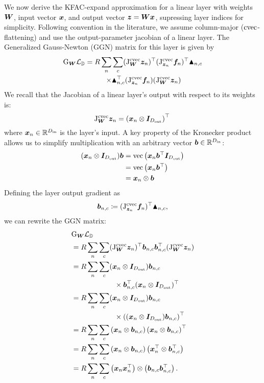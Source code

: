 We now derive the KFAC-expand approximation for a linear layer with weights ${\bm{W}}$, input vector ${\bm{x}}$, and output vector ${\bm{z}} = {\bm{W}}{\bm{x}}$, supressing layer indices for simplicity. Following convention in the literature, we assume column-major ($\operatorname{cvec}$-flattening) and use the output-parameter jacobian of a linear layer. The Generalized Gauss-Newton (GGN) matrix for this layer is given by
\begin{align*}
  \mathrm{G}_{{\bm{W}}} {\mathcal{L}}_{{\mathbb{D}}}
  =
    R
    \sum_n &\sum_c
    (\mathrm{J}^{\operatorname{cvec}}_{{\bm{W}}}{\bm{z}}_n)^{\top}
    (\mathrm{J}^{\operatorname{cvec}}_{{\bm{z}}_n}{\bm{f}}_n)^{\top}
    \blacktriangle_{n,c} \\
    \times
    &\blacktriangle_{n,c}^{\top}
    (\mathrm{J}^{\operatorname{cvec}}_{{\bm{z}}_n}{\bm{f}}_n)
    (\mathrm{J}^{\operatorname{cvec}}_{{\bm{W}}}{\bm{z}}_n)
\end{align*}
We recall that the Jacobian of a linear layer's output with respect to its weights is:
$$ \mathrm{J}^{\operatorname{cvec}}_{{\bm{W}}}{\bm{z}}_n = \left({\bm{x}}_n \otimes {\bm{I}}_{D_{\text{out}}}\right)^{\top}\, $$
where ${\bm{x}}_n \in \mathbb{R}^{D_\text{in}}$ is the layer's input. 
A key property of the Kronecker product allows us to simplify multiplication with an arbitrary vector ${\bm{b}} \in {\mathbb{R}}^{D_{\text{in}}}$:
\begin{align*} 
  ({\bm{x}}_n \otimes {\bm{I}}_{D_{\text{out}}}) {\bm{b}} &= \text{vec}\left({\bm{x}}_n {\bm{b}}^{\top}{\bm{I}}_{D_{\text{out}}}\right) \\
  &= \text{vec}\left( {\bm{x}}_n {\bm{b}}^{\top} \right) \\
  &= {\bm{x}}_n \otimes {\bm{b}}
\end{align*}
Defining the layer output gradient as $${\bm{b}}_{n,c} \coloneq (\mathrm{J}^{\operatorname{cvec}}_{{\bm{z}}_n}{\bm{f}}_n)^{\top} \blacktriangle_{n,c},$$ we can rewrite the GGN matrix:
\begin{align*}
  &\mathrm{G}_{{\bm{W}}} {\mathcal{L}}_{{\mathbb{D}}} \\
  &= R \sum_n \sum_c
  (\mathrm{J}^{\operatorname{cvec}}_{{\bm{W}}}{\bm{z}}_n)^{\top}
  {\bm{b}}_{n,c} {\bm{b}}_{n,c}^{\top}
  (\mathrm{J}^{\operatorname{cvec}}_{{\bm{W}}}{\bm{z}}_n) \\
  &= R \sum_n \sum_c ({\bm{x}}_n \otimes {\bm{I}}_{D_{\text{out}}}) {\bm{b}}_{n,c} \\
  & \qquad \qquad \qquad \times{\bm{b}}_{n,c}^{\top}
  ({\bm{x}}_n \otimes {\bm{I}}_{D_{\text{out}}})^{\top} \\
  &= R \sum_n \sum_c ({\bm{x}}_n \otimes {\bm{I}}_{D_{\text{out}}}) {\bm{b}}_{n,c} \\
  & \qquad \qquad \qquad \times \left(({\bm{x}}_n \otimes {\bm{I}}_{D_{\text{out}}}) {\bm{b}}_{n,c} \right)^{\top} \\
  &= R \sum_n \sum_c \left( {\bm{x}}_n \otimes {\bm{b}}_{n,c} \right) 
  \left( {\bm{x}}_n \otimes {\bm{b}}_{n,c} \right)^{\top} \\
  &= R \sum_n \sum_c \left( {\bm{x}}_n \otimes {\bm{b}}_{n,c} \right) 
  \left( {\bm{x}}_n^{\top} \otimes {\bm{b}}_{n,c}^{\top} \right) \\
  &= R \sum_n \sum_c \left({\bm{x}}_n {\bm{x}}_n^{\top}\right) \otimes \left({\bm{b}}_{n,c} {\bm{b}}_{n,c}^{\top}\right).
\end{align*}

